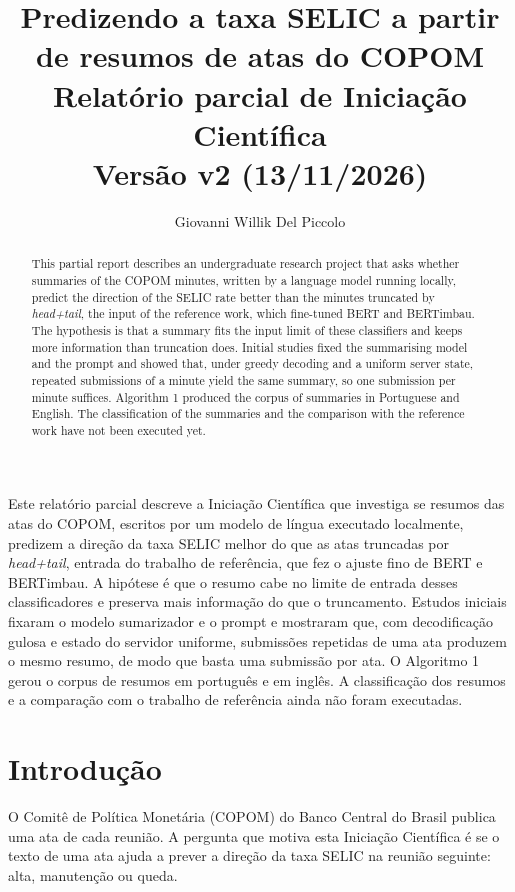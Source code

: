 \documentclass[12pt]{article}
\title{Predizendo a taxa SELIC a partir de resumos de atas do COPOM\\
  \normalsize Relatório parcial de Iniciação Científica\\
  \normalsize Versão v2 (13/11/2026)}
\author{Giovanni Willik Del Piccolo\inst{1}}
\begin{document}
\maketitle

\begin{abstract}
  This partial report describes an undergraduate research project that asks
  whether summaries of the COPOM minutes, written by a language model running
  locally, predict the direction of the SELIC rate better than the minutes
  truncated by \textit{head+tail}, the input of the reference work, which
  fine-tuned BERT and BERTimbau. The hypothesis is that a summary fits the
  input limit of these classifiers and keeps more information than truncation
  does. Initial studies fixed the summarising model and the prompt and showed
  that, under greedy decoding and a uniform server state, repeated submissions
  of a minute yield the same summary, so one submission per minute suffices.
  Algorithm 1 produced the corpus of summaries in Portuguese and English. The
  classification of the summaries and the comparison with the reference work
  have not been executed yet.
\end{abstract}

\begin{resumo}
  Este relatório parcial descreve a Iniciação Científica que investiga se
  resumos das atas do COPOM, escritos por um modelo de língua executado
  localmente, predizem a direção da taxa SELIC melhor do que as atas truncadas
  por \textit{head+tail}, entrada do trabalho de referência, que fez o ajuste
  fino de BERT e BERTimbau. A hipótese é que o resumo cabe no limite de entrada
  desses classificadores e preserva mais informação do que o truncamento.
  Estudos iniciais fixaram o modelo sumarizador e o prompt e mostraram que, com
  decodificação gulosa e estado do servidor uniforme, submissões repetidas de
  uma ata produzem o mesmo resumo, de modo que basta uma submissão por ata. O
  Algoritmo 1 gerou o corpus de resumos em português e em inglês. A
  classificação dos resumos e a comparação com o trabalho de referência ainda
  não foram executadas.
\end{resumo}

\section{Introdução}\label{sec:intro}

O Comitê de Política Monetária (COPOM) do Banco Central do Brasil publica uma
ata de cada reunião. A pergunta que motiva esta Iniciação Científica é se o
texto de uma ata ajuda a prever a direção da taxa SELIC na reunião seguinte:
alta, manutenção ou queda.
\end{document}
